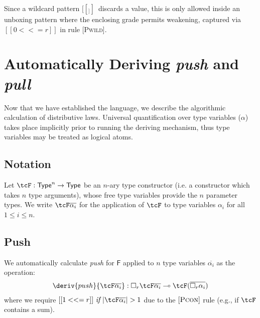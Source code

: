 Since a wildcard pattern $[[ _ ]]\,$ discards a value, this is only
allowed inside an unboxing pattern where the enclosing grade
permits weakening, captured via $[[ 0 <<= r ]]$ in rule \textsc{[Pwild]}.

\section{Automatically Deriving \emph{push} and \emph{pull}}
\label{sec:push-pull-deriv}
Now that we have established the language, we describe the algorithmic
calculation of distributive laws. Universal quantification over type variables
($\alpha$) takes place implicitly prior to running the deriving mechanism, thus
 type variables may be treated as logical atoms.

%
\subsection{Notation}
Let $\tcF : \mathsf{Type}^n \rightarrow \mathsf{Type}$
be an $n$-ary type constructor (i.e. a constructor which takes $n$ type arguments), whose free type variables
provide the $n$ parameter types. We write $\tcF \overline{\alpha_i}$ for
the application of $\tcF$ to
type variables $\alpha_i$ for all $1 \leq i \leq n$.

%
\subsection{Push}
We automatically
calculate \emph{push} for $\mathsf{F}$
applied to $n$ type variables
$\overline{\alpha_i}$
as the operation:
%
\begin{align*}
\deriv{push}{\tcF \overline{\alpha_i}} : \Box_{r} \tcF \overline{\alpha_i}
  \multimap  \tcF  (\overline{\Box_{r} \alpha_i})
 \end{align*}
where we require $[[ 1 <<= r ]]\ \textit{if}\ |\tcF \overline{\alpha_i}| > 1$
due to the $[\textsc{Pcon}]$ rule (e.g., if $\tcF$ contains a sum).

